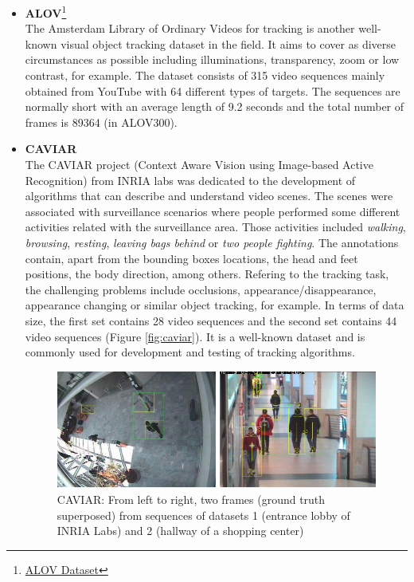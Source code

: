\begin{itemize}
\begin{figure}[H]
\begin{center}
\label{fig:mot}
\end{center}
\end{figure}
\item \textbf{ALOV}\footnote{{\href{http://alov300pp.joomlafree.it/dataset-resources.html}{ALOV Dataset}}}\\
The Amsterdam Library of Ordinary Videos for tracking is another well-known visual object tracking dataset in the field. It aims to cover as diverse circumstances as possible including illuminations, transparency, zoom or low contrast, for example. The dataset consists of 315 video sequences mainly obtained from YouTube with 64 different types of targets. The sequences are normally short with an average length of 9.2 seconds and the total number of frames is 89364 (in ALOV300).
\item \textbf{CAVIAR} \cite{dubuisson2016survey}\\
The CAVIAR project (Context Aware Vision using Image-based Active Recognition) from INRIA labs was dedicated to the development of algorithms that can describe and understand video scenes. The scenes were associated with surveillance scenarios where people performed some different activities related with the surveillance area. Those activities included \textit{walking}, \textit{browsing}, \textit{resting}, \textit{leaving bags behind} or \textit{two people fighting}. The annotations contain, apart from the bounding boxes locations, the head and feet positions, the body direction, among others. Refering to the tracking task, the challenging problems include occlusions, appearance/disappearance, appearance changing or similar object tracking, for example. In terms of data size, the first set contains 28 video sequences and the second set contains 44 video sequences (Figure \ref{fig:caviar}). It is a well-known dataset and is commonly used for development and testing of tracking algorithms.
\begin{figure}[H]
\begin{center}
\includegraphics[scale=0.3]{previous_version/caviar.png}
\caption{CAVIAR: From  left  to right, two frames (ground truth superposed) from sequences of datasets 1 (entrance lobby of INRIA Labs) and 2 (hallway of a shopping center) ~\cite{dubuisson2016survey}}

\end{center}
\end{figure}
\end{itemize}
